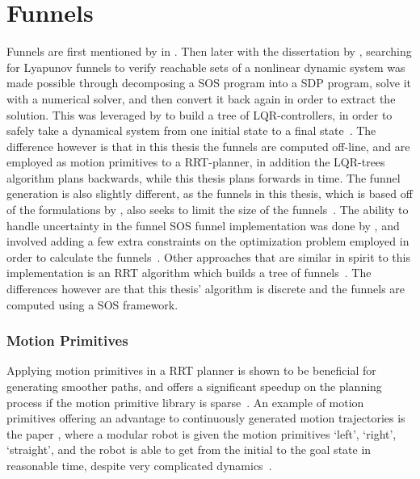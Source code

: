 \section{Funnels}

Funnels are first mentioned by \citeauthor{masonMechanicsManipulation1985} in
\citeyear{masonMechanicsManipulation1985}. Then later with the dissertation
 by
\citeauthor{parilloStructuredSemidefinitePrograms}, searching for Lyapunov
funnels to verify reachable sets of a nonlinear dynamic system was made possible
through decomposing a \ac{SOS} program into a \ac{SDP} program, solve it with a
numerical solver, and then convert it back again in order to extract the
solution. This was leveraged by \citeauthor{tedrakeLQRtreesFeedbackMotion2009}
to build a tree of \ac{LQR}-controllers, in order to safely take a dynamical
system from one initial state to a final
state~\cite{tedrakeLQRtreesFeedbackMotion2009}. The difference however is that
in this thesis the funnels are computed off-line, and are employed as motion
primitives to a \ac{RRT}-planner, in addition the \ac{LQR}-trees algorithm plans
backwards, while this thesis plans forwards in time. The funnel generation is
also slightly different, as the funnels in this thesis, which is based off of
the formulations by \citeauthor{majumdarFunnelLibrariesRealtime2017}, also seeks
to limit the size of the funnels~\cite{majumdarFunnelLibrariesRealtime2017}. The
ability to handle uncertainty in the funnel \ac{SOS} funnel implementation was
done by \citeauthor{majumdarRobustOnlineMotion2013}, and involved adding a few
extra constraints on the optimization problem employed in order to calculate the
funnels~\cite{majumdarRobustOnlineMotion2013}. Other approaches that are similar
in spirit to this implementation is an \ac{RRT} algorithm which builds a tree of
funnels~\cite{lenySequentialCompositionRobust2012}. The differences however are
that this thesis' algorithm is discrete and the funnels are computed using a
\ac{SOS} framework.

\subsubsection{Motion Primitives}

Applying motion primitives in a \ac{RRT} planner is shown to be beneficial for
generating smoother paths, and offers a significant speedup on the planning
process if the motion primitive library is
sparse~\cite{vonasekGlobalMotionPlanning2013}. An example of motion primitives
offering an advantage to continuously generated motion trajectories is the paper
, where a modular robot is given
the motion primitives `left', `right', `straight', and the robot is able to get
from the initial to the goal state in reasonable time, despite very complicated
dynamics~\cite{vonasekHighlevelMotionPlanning2015}.
